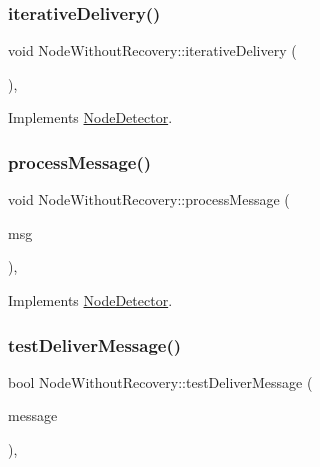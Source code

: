 \subsubsection{\texorpdfstring{iterative\+Delivery()}{iterativeDelivery()}}
{\footnotesize\ttfamily void Node\+Without\+Recovery\+::iterative\+Delivery (\begin{DoxyParamCaption}{ }\end{DoxyParamCaption})\hspace{0.3cm}{\ttfamily [protected]}, {\ttfamily [virtual]}}



Implements \hyperlink{classNodeDetector_a17ecf9939fce7471f4513b66185743cc}{Node\+Detector}.

\mbox{\label{classNodeWithoutRecovery_a0b44132b4ebc650399711766cb050399}} 
\subsubsection{\texorpdfstring{process\+Message()}{processMessage()}}
{\footnotesize\ttfamily void Node\+Without\+Recovery\+::process\+Message (\begin{DoxyParamCaption}\item[{c\+Message $\ast$}]{msg }\end{DoxyParamCaption})\hspace{0.3cm}{\ttfamily [protected]}, {\ttfamily [virtual]}}



Implements \hyperlink{classNodeDetector_ab69432c6d3327a684845ec231826727e}{Node\+Detector}.

\mbox{\label{classNodeWithoutRecovery_a8cf83ec6d0af26e385dcde0bc03f5b6d}} 
\subsubsection{\texorpdfstring{test\+Deliver\+Message()}{testDeliverMessage()}}
{\footnotesize\ttfamily bool Node\+Without\+Recovery\+::test\+Deliver\+Message (\begin{DoxyParamCaption}\item[{const \hyperlink{structures_8h_a7e7bdc1d2fff8a9436f2f352b2711ed6}{message\+Info} \&}]{message }\end{DoxyParamCaption})\hspace{0.3cm}{\ttfamily [protected]}, {\ttfamily [virtual]}}



